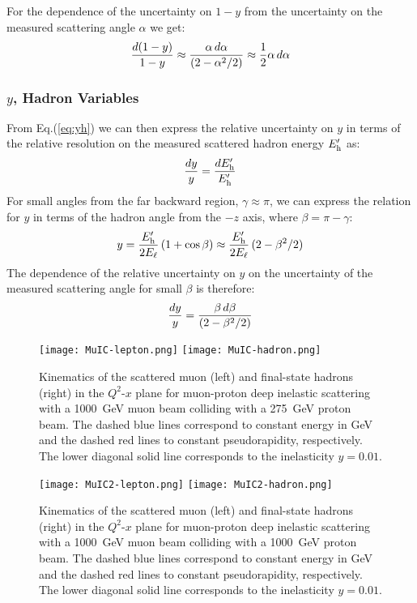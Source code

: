 \documentclass[12pt]{article}
\begin{document}
For the dependence of the uncertainty on $1-y$ from the uncertainty on the measured scattering angle $\alpha$  we get:
%
\begin{equation}
{d(1-y) \over 1-y} \approx {\alpha\, d\alpha \over (2-\alpha^2/2)} \approx {1 \over 2} \alpha\, d\alpha 
\end{equation}
%


\subsubsection{$y$, Hadron Variables}

From Eq.(\ref{eq:yh}) we can then express the relative uncertainty on $y$ in terms of the relative resolution on the measured scattered hadron energy $E^\prime_{\rm h}$ as:
%
\begin{equation}
{dy \over y} = {dE^\prime_{\rm h} \over E^\prime_{\rm h}}
\end{equation}
%
For small angles from the far backward region, $\gamma \approx \pi$, we can express the relation for $y$ in terms of the hadron angle from the $-z$ axis, where $\beta = \pi - \gamma$:
%
\begin{equation}
y = {E^\prime_{\rm h} \over 2 E_\ell} \, (1+\cos\beta) \approx {E^\prime_{\rm h} \over 2 E_\ell} \, (2-\beta^2/2)
\end{equation}
%
The dependence of the relative uncertainty on $y$ on the uncertainty of the measured scattering angle for small $\beta$ is therefore:
%
\begin{equation}
{dy \over y} = {\beta\, d\beta \over (2-\beta^2/2)}
\end{equation}
%

%

\begin{figure}[!htb]
    \centering
    \texttt{[image: MuIC-lepton.png]}
    \texttt{[image: MuIC-hadron.png]}
    \caption{Kinematics of the scattered muon (left) and final-state hadrons (right) in the $Q^2$-$x$ plane for muon-proton deep inelastic scattering with a 1000~GeV muon beam colliding with a 275~GeV proton beam. The dashed blue lines correspond to constant  energy in GeV and the dashed red lines to constant pseudorapidity, respectively. The lower diagonal solid line corresponds to the inelasticity $y=0.01$.}
    \label{fig:MuICkinematics}
\end{figure}

\begin{figure}[!htb]
    \centering
    \texttt{[image: MuIC2-lepton.png]}
    \texttt{[image: MuIC2-hadron.png]}
    \caption{Kinematics of the scattered muon (left) and final-state hadrons (right) in the $Q^2$-$x$ plane for muon-proton deep inelastic scattering with a 1000~GeV muon beam colliding with a 1000~GeV proton beam. The dashed blue lines correspond to constant  energy in GeV and the dashed red lines to constant pseudorapidity, respectively. The lower diagonal solid line corresponds to the inelasticity $y=0.01$.}
    \label{fig:MuIC2kinematics}
\end{figure}
\end{document}
